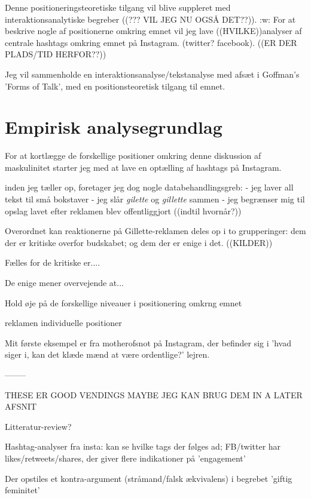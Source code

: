 Denne positioneringsteoretiske tilgang vil blive suppleret med
interaktionsanalytiske begreber ((??? VIL JEG NU OGSÅ DET??)).
:w: For at beskrive nogle af positionerne omkring emnet vil jeg
lave ((HVILKE))analyser af centrale hashtags omkring emnet på
Instagram.   (twitter?  facebook). ((ER DER PLADS/TID HERFOR??))


Jeg vil sammenholde en interaktionsanalyse/tekstanalyse med afsæt
i Goffman's 'Forms of Talk', med en positionsteoretisk tilgang til
emnet. 


\section{Empirisk analysegrundlag}

For at kortlægge de forskellige positioner omkring denne 
diskussion af maskulinitet starter jeg med at lave en optælling af 
hashtags på Instagram.

inden jeg tæller op, foretager jeg dog nogle databehandlingsgreb:
- jeg laver all tekst til små bokstaver
- jeg slår \emph{gilette} og \emph{gillette} sammen
- jeg begrænser mig til opslag lavet efter reklamen blev
offentliggjort ((indtil hvornår?))


Overordnet kan reaktionerne på Gillette-reklamen deles op i to
grupperinger: dem der er kritiske overfor budskabet; og dem der er
enige i det. ((KILDER))

Fælles for de kritiske er....

De enige mener overvejende at...

Hold øje på de forskellige niveauer i positionering omkrng emnet

reklamen
individuelle positioner


Mit første eksempel er fra motherofsnot på Instagram, der befinder
sig i 'hvad siger i, kan det klæde mænd at være ordentlige?'
lejren.

—-----

THESE ER GOOD VENDINGS MAYBE JEG KAN BRUG DEM IN A LATER AFSNIT







Litteratur-review?

Hashtag-analyser fra insta: kan se hvilke tags der følges ad;
FB/twitter har likes/retweets/shares, der giver flere indikationer
på 'engagement'

Der opstiles et kontra-argument (stråmand/falsk ækvivalens) i
begrebet 'giftig feminitet'

